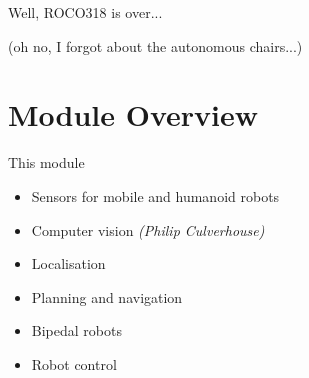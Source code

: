 \documentclass[compress]{beamer}
\begin{document}
\begin{frame}[plain]{}
    Well, ROCO318 is over...

    \pause
    (oh no, I forgot about the autonomous chairs...)
\end{frame}




\section{Module Overview}
\begin{frame}{This module}

\begin{itemize}
\item Sensors for mobile and humanoid robots
\item Computer vision \emph{(Philip Culverhouse)}
\item Localisation
\item Planning and navigation
\item Bipedal robots
\item Robot control
\end{itemize}

\end{frame}
\end{document}
